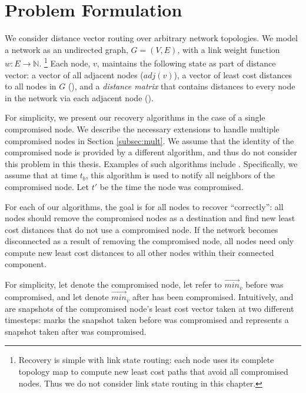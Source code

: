 \section{Problem Formulation}
\label{sec:problem}

We consider distance vector routing \cite{Gall87} over arbitrary network topologies. We model a network as an undirected graph, $G=(V,E)$,
with a link weight function $w: E \rightarrow \mathbb{N}$.
{\footnote {\small Recovery is simple with link state routing: each node uses its complete topology map to compute new least cost paths that avoid all compromised nodes.
Thus we do not consider link state routing in this chapter.}}
Each node, $v$, maintains the following state as part of distance vector: a vector of all adjacent nodes ($adj(v)$), a vector of least cost distances to all
nodes in $G$ (\minvvs), and a \emph{distance matrix} that contains distances to every node in the network via each adjacent node (\dmatrixvs). 

For simplicity, we present our recovery algorithms in the case of a single compromised node.
We describe the necessary extensions to handle multiple compromised nodes in Section \ref{subsec:mult}.
We assume that the identity of the compromised node is provided by a different algorithm, and thus do not consider this problem in this thesis.
Examples of such algorithms include \cite{Arini,Feam,Vishal02,Pad03,Paul02}. %
Specifically, we assume that at time $t_b$, this algorithm is used to notify all neighbors of the 
compromised node. Let $t'$ be the time the node was compromised.

For each of our algorithms, the goal is for all nodes to recover ``correctly'': all nodes should remove the compromised nodes as a destination and find
new least cost distances that do not use a compromised node. If the network becomes disconnected as a result of removing the compromised node, all
nodes need only compute new least cost distances to all other nodes within their connected component.

For simplicity, let \bad denote the compromised node, let \oldvector refer to $\overrightarrow{min}_{\overline{v}}$ 
before \bad was compromised, and let \badvector denote $\overrightarrow{min}_{\overline{v}}$ after \bad has been compromised.
Intuitively, \oldvector and \badvector are snapshots of the compromised node's least cost vector taken at two different timesteps: \oldvector marks the snapshot taken before \bad was compromised and 
\badvector represents a snapshot taken after \bad was compromised.


